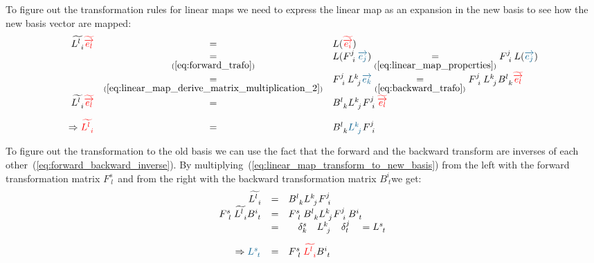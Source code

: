 To figure out the transformation rules for linear maps we need to express the linear map
as an expansion in the new basis to see how the new basis vector are mapped:
\begin{equation}
    \label{eq:linear_map_transform_to_new_basis}  
    \begin{array}{rcl}
        \widetilde{L^{l~}_{~i}}\hdbtv{l} & = & L(\hdbtv{i}) \\
        & \underset{(\ref{eq:forward_trafo})}{=} &
        L(F^{j~}_{~i}\hdbv{j}) \underset{(\ref{eq:linear_map_properties})}{=}
        F^{j~}_{~i}L(\hdbv{j}) \\
        & \underset{(\ref{eq:linear_map_derive_matrix_multiplication_2})}{=} &
        F^{j~}_{~i}L^{k~}_{~j}\hdbv{k} \underset{(\ref{eq:backward_trafo})}{=}
        F^{j~}_{~i}L^{k~}_{~j} B^{l~}_{~k}\hdbtv{l} \\
        \widetilde{L^{l~}_{~i}}\hdbtv{l} & = &
        B^{l~}_{~k} L^{k~}_{~j} F^{j~}_{~i} \hdbtv{l} \\
        \noalign{\vskip10pt}
        \Rightarrow \textcolor{red}{\widetilde{L^{l~}_{~i}}} & = &
        B^{l~}_{~k} \textcolor{MidnightBlue}{L^{k~}_{~j}} F^{j~}_{~i}
    \end{array}
\end{equation}

To figure out the transformation to the old basis we can use the fact that the forward and
the backward transform are inverses of each other~(\ref{eq:forward_backward_inverse}). By
multiplying~(\ref{eq:linear_map_transform_to_new_basis}) from the left with the forward
transformation matrix $F^{s~}_{~l}$ and from the right with the backward transformation
matrix $B^{i~}_{~t}$we get:
\begin{equation}
    \label{eq:linear_map_transform_to_old_basis}  
    \begin{array}{rcl}
        \widetilde{L^{l~}_{~i}} & = &
        B^{l~}_{~k} L^{k~}_{~j} F^{j~}_{~i} \\
        F^{s~}_{~l} \widetilde{L^{l~}_{~i}} B^{i~}_{~t} & = &
        F^{s~}_{~l} B^{l~}_{~k} L^{k~}_{~j} F^{j~}_{~i} B^{i~}_{~t} \\
        & = & \quad \delta^s_k \quad L^{k~}_{~j} \quad \delta^j_t \quad = L^{s~}_{~t} \\
        \noalign{\vskip10pt}
        \Rightarrow \textcolor{MidnightBlue}{L^{s~}_{~t}} & = &
        F^{s~}_{~l} \textcolor{red}{\widetilde{L^{l~}_{~i}}} B^{i~}_{~t}  
    \end{array}
\end{equation}


